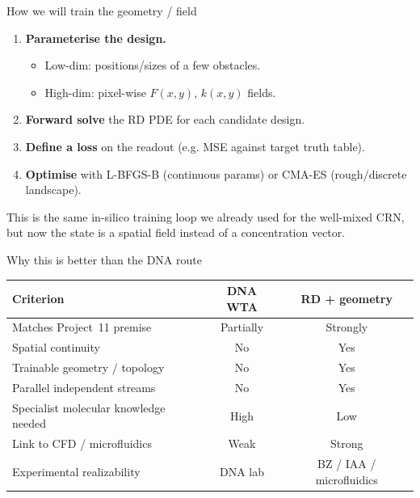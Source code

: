 \documentclass[aspectratio=169,11pt]{beamer}
\begin{document}
\begin{frame}{How we will train the geometry / field}

\begin{enumerate}
    \item \textbf{Parameterise the design.}
    \begin{itemize}
        \item Low-dim: positions/sizes of a few obstacles.
        \item High-dim: pixel-wise $F(x,y)$, $k(x,y)$ fields.
    \end{itemize}
    \item \textbf{Forward solve} the RD PDE for each candidate design.
    \item \textbf{Define a loss} on the readout (e.g. MSE against target truth table).
    \item \textbf{Optimise} with L-BFGS-B (continuous params) or CMA-ES (rough/discrete landscape).
\end{enumerate}

\vspace{0.3cm}
This is the same in-silico training loop we already used for the well-mixed CRN, but now the state is a spatial field instead of a concentration vector.

\end{frame}

\begin{frame}{Why this is better than the DNA route}

\begin{table}
\centering
\small
\begin{tabular}{p{4.5cm}cc}
\toprule
\textbf{Criterion} & \textbf{DNA WTA} & \textbf{RD + geometry} \\
\midrule
Matches Project~11 premise & Partially & Strongly \\
Spatial continuity & No & Yes \\
Trainable geometry / topology & No & Yes \\
Parallel independent streams & No & Yes \\
Specialist molecular knowledge needed & High & Low \\
Link to CFD / microfluidics & Weak & Strong \\
Experimental realizability & DNA lab & BZ / IAA / microfluidics \\
\bottomrule
\end{tabular}
\end{table}

\end{frame}
\end{document}
